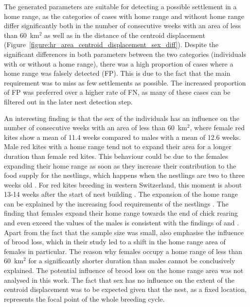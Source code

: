 The generated parameters are suitable for detecting a possible settlement in a home range, as the categories of cases with home range and without home range differ significantly both in the number of consecutive weeks with an area of less than 60~km$^2$ as well as in the distance of the centroid displacement (Figure~\ref{figure:hr_area_centroid_displacement_sex_diff}). Despite the significant differences in both parameters between the two categories (individuals with or without a home range), there was a high proportion of cases where a home range was falsely detected (FP). This is due to the fact that the main requirement was to miss as few settlements as possible. The increased proportion of FP was preferred over a higher rate of FN, as many of these cases can be filtered out in the later nest detection step.

An interesting finding is that the sex of the individuals has an influence on the number of consecutive weeks with an area of less than 60~km$^2$, where female red kites show a mean of 11.4 weeks compared to males with a mean of 12.6 weeks. Male red kites with a home range tend not to expand their area for a longer duration than female red kites. This behaviour could be due to the females expanding their home range as soon as they increase their contribution to the food supply for the nestlings, which happens when the nestlings are two to three weeks old \parencite{aebischer2021rotmilan}. For red kites breeding in western Switzerland, this moment is about 13-14 weeks after the start of nest building \parencite{scherler2023brutbiologie}. The expansion of the home range can be explained by the increasing food requirements of the nestlings \parencite{bischofberger2019werden, spatz2019raumnutzung}. The finding that females expand their home range towards the end of chick rearing and even exceed the values of the males is consistent with the findings of \textcite{spatz2019raumnutzung} and \textcite{spatz2021zwischen}. Apart from the fact that the sample size was small, \textcite{spatz2019raumnutzung} also emphasise the influence of brood loss, which in their study led to a shift in the home range area of females in particular. The reason why females occupy a home range of less than 60~km$^2$ for a significantly shorter duration than males cannot be conclusively explained. The potential influence of brood loss on the home range area was not analysed in this work. The fact that sex has no influence on the extent of the centroid displacement was to be expected given that the nest, as a fixed location, represents the focal point of the whole breeding cycle.



